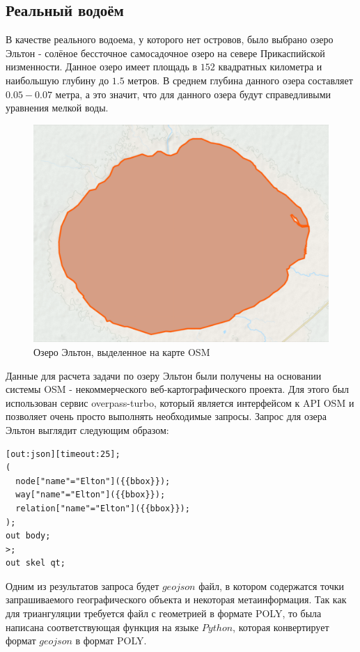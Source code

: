 \documentclass[14pt]{extreport}
\begin{document}
\subsection{Реальный водоём}


В качестве реального водоема, у которого нет островов, было выбрано озеро Эльтон - солёное бессточное самосадочное озеро на севере Прикаспийской низменности. Данное озеро имеет площадь в $152$ квадратных километра и наибольшую глубину до $1.5$ метров. В среднем глубина данного озера составляет $0.05 - 0.07$ метра, а это значит, что для данного озера будут справедливыми уравнения мелкой воды.

\begin{figure}[H]
\centerline{
\includegraphics[width=0.8\linewidth]{images/lake_elton}}
\caption{Озеро Эльтон, выделенное на карте OSM}
\label{img:lake:elton}
\end{figure}

Данные для расчета задачи по озеру Эльтон были получены на основании системы OSM\cite{bib:website:osm} - некоммерческого веб-картографического проекта. Для этого был использован сервис overpass-turbo\cite{bib:website:overpassturbo}, который является интерфейсом к API OSM и позволяет очень просто выполнять необходимые запросы. Запрос для озера Эльтон выглядит следующим образом:

\begin{lstlisting}[frame=single]
[out:json][timeout:25];
(
  node["name"="Elton"]({{bbox}});
  way["name"="Elton"]({{bbox}});
  relation["name"="Elton"]({{bbox}});
);
out body;
>;
out skel qt;	
\end{lstlisting}

Одним из результатов запроса будет $geojson$ файл, в котором содержатся точки запрашиваемого географического объекта и некоторая метаинформация. Так как для триангуляции требуется файл с геометрией в формате POLY, то была написана соответствующая функция на языке $Python$, которая конвертирует формат $geojson$ в формат POLY.
\end{document}
